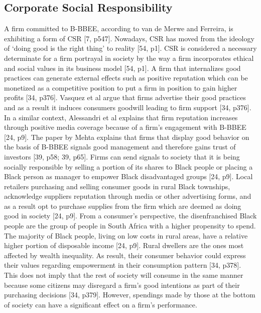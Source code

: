 \subsection{Corporate Social Responsibility}
A firm committed to B-BBEE, according to van de Merwe and Ferreira, is exhibiting a form of CSR [7, p547]. Nowadays, CSR has moved from the ideology of ‘doing good is the right thing’ to reality [54, p1]. CSR is considered a necessary determinate for a firm portrayal in society by the way a firm incorporates ethical and social values in its business model [54, p1]. A firm that internalizes good practices can generate external effects such as positive reputation which can be monetized as a competitive position to put a firm in position to gain higher profits [34, p376]. Vasquez et al argue that firms advertise their good practices and as a result it induces consumers goodwill leading to firm support [34, p376]. In a similar context, Alessandri et al explains that firm reputation increases through positive media coverage because of a firm's engagement with B-BBEE [24, p9]. The paper by Mehta explains that firms that display good behavior on the basis of B-BBEE signals good management and therefore gains trust of investors [39, p58; 39, p65]. Firms can send signals to society that it is being socially responsible by selling a portion of its shares to Black people or placing a Black person as manager to empower Black disadvantaged groups [24, p9]. Local retailers purchasing and selling consumer goods in rural Black townships, acknowledge suppliers reputation through media or other advertising forms, and as a result opt to purchase supplies from the firm which are deemed as doing good in society [24, p9]. From a consumer’s perspective, the disenfranchised Black people are the group of people in South Africa with a higher propensity to spend. The majority of Black people, living on low costs in rural areas, have a relative higher portion of disposable income [24, p9]. Rural dwellers are the ones most affected by wealth inequality. As result, their consumer behavior could express their values regarding empowerment in their consumption pattern [34, p378]. This does not imply that the rest of society will consume in the same manner because some citizens may disregard a firm’s good intentions as part of their purchasing decisions [34, p379]. However, spendings made by those at the bottom of society can have a significant effect on a firm's performance. 
